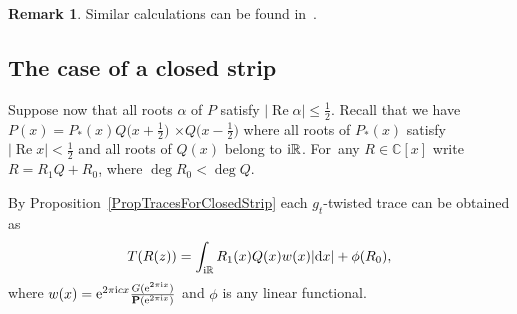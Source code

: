 \documentclass[pdftex]{sigma}
\newcommand{\RN}{\mathbb{R}} %
\newcommand{\CN}{\mathbb{C}} %
\renewcommand{\Re}{\operatorname{Re}}
\newcommand{\bP}{\mathbf{P}}
\theoremstyle{definition}
\newtheorem{Remark}[Theorem]{Remark}
\numberwithin{equation}{section}
\begin{document}
\begin{Remark} Similar calculations can be found in~\cite[Section~8.1]{DPY}.
\end{Remark}

\subsection{The case of a closed strip}
Suppose now that all roots $\alpha$ of $P$ satisfy $|\Re\alpha|\leq \frac{1}{2}$. Recall that we have $P(x)=P_*(x)Q\big(x+\frac{1}{2}\big)$ $\times Q\big(x-\tfrac{1}{2}\big)$ where all roots of $P_*(x)$ satisfy $|\Re x|<\frac{1}{2}$ and all roots of $Q(x)$ belong to ${\rm i}\RN$. For~any $R\in \CN[x]$ write $R=R_1Q+R_0$, where $\deg R_0<\deg Q$.

By Proposition~\ref{PropTracesForClosedStrip} each $g_t$-twisted trace can be obtained as
\[
T(R(z))=\int_{{\rm i}\RN}R_1(x)Q(x)w(x)|{\rm d}x|+\phi(R_0),
\]
where $w(x)={\rm e}^{2\pi {\rm i} cx}\frac{G({\rm e}^{2\pi {\rm i} x})}{\bP({\rm e}^{2\pi {\rm i}x})}$ and $\phi$ is any linear functional.
\end{document}
